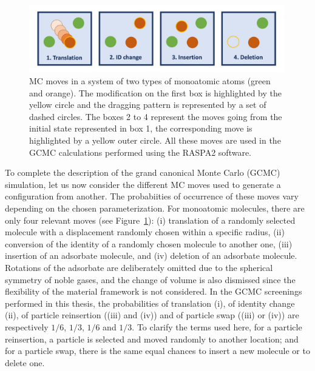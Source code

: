 \documentclass[main.tex]{subfiles}
\begin{document}
\begin{figure}[ht]
  \centering
  \includegraphics[width=0.99\textwidth]{figures/2-thermo/MC_moves.jpg}
  \caption{MC moves in a system of two types of monoatomic atoms (green and orange). The modification on the first box is highlighted by the yellow circle and the dragging pattern is represented by a set of dashed circles. The boxes 2 to 4 represent the moves going from the initial state represented in box 1, the corresponding move is highlighted by a yellow outer circle. All these moves are used in the GCMC calculations performed using the RASPA2 software. }\label{fgr:mc}
\end{figure}

To complete the description of the grand canonical Monte Carlo (GCMC) simulation, let us now consider the different MC moves used to generate a configuration from another. The probabiities of occurrence of these moves vary depending on the chosen parameterization. For monoatomic molecules, there are only four relevant moves (see Figure~\ref{fgr:mc}): (i) translation of a randomly selected molecule with a displacement randomly chosen within a specific radius, (ii) conversion of the identity of a randomly chosen molecule to another one, (iii) insertion of an adsorbate molecule, and (iv) deletion of an adsorbate molecule. Rotations of the adsorbate are deliberately omitted due to the spherical symmetry of noble gases, and the change of volume is also dismissed since the flexibility of the material framework is not considered. In the GCMC screenings performed in this thesis, the probabilities of translation (i), of identity change (ii), of particle reinsertion ((iii) and (iv)) and of particle swap ((iii) or (iv)) are respectively $1/6$, $1/3$, $1/6$ and $1/3$. To clarify the terms used here, for a particle reinsertion, a particle is selected and moved randomly to another location; and for a particle swap, there is the same equal chances to insert a new molecule or to delete one. 
\end{document}
